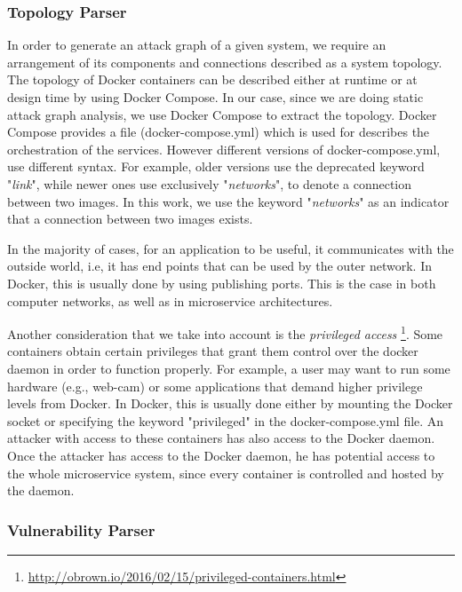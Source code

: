 \subsubsection{Topology Parser}
\label{chap:topology_p}

In order to generate an attack graph of a given system, we require an arrangement of its components and connections described as a system topology. The topology of Docker containers can be described either at  runtime or at design time by using Docker Compose. In our case, since we are doing static attack graph analysis, we use Docker Compose to extract the topology. Docker Compose provides a  file (docker-compose.yml) which is used for describes the orchestration of the services. However different versions of docker-compose.yml, use different syntax. For example, older versions use the deprecated keyword "\textit{link}", while newer ones use exclusively "\textit{networks}", to denote a connection between two images. In this work, we use the keyword "\textit{networks}" as an indicator that a connection between two images exists.

In the majority of cases, for an application to be useful, it communicates with the outside world, i.e, it has end points that can be used by the outer network. In Docker, this is usually done by using publishing ports. This is the case in both computer networks, as well as in microservice architectures.

Another consideration that we take into account is the \textit{privileged access} \footnote{\url{http://obrown.io/2016/02/15/privileged-containers.html}}. Some containers obtain certain privileges that grant them control over the docker daemon in order to function properly. For example, a user may want to run some hardware (e.g., web-cam) or some applications that demand higher privilege levels  from Docker. In Docker, this is usually done either by mounting the Docker socket or specifying the keyword "privileged" in the docker-compose.yml file. An attacker with access to these containers has also access to the Docker daemon. Once the attacker has access to the Docker daemon, he has potential access to the whole microservice system, since every container is controlled and hosted by the daemon.




\subsubsection{Vulnerability Parser}
\label{chap:vulnerability_p}

